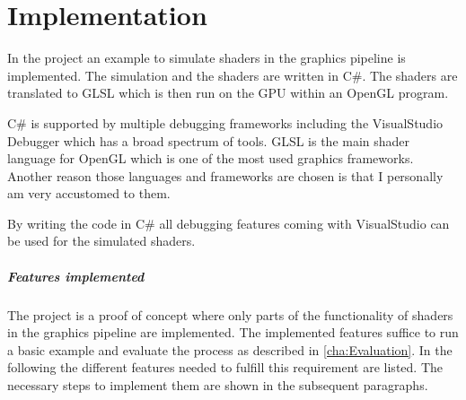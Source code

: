 
\chapter{Implementation}\label{cha:Implementation}

In the project  an example to simulate shaders in the graphics pipeline is implemented. The simulation and the shaders are written in C\#. The shaders are translated to GLSL which is then run on the GPU within an OpenGL program.

C\# is supported by multiple debugging frameworks including the VisualStudio Debugger which has a broad spectrum of tools.  GLSL is the main shader language for OpenGL which is one of the most used graphics frameworks. 
Another reason those languages and frameworks are chosen is that I personally am very accustomed to them.

By writing the code in C\# all debugging features coming with VisualStudio can be used for the simulated shaders.

\paragraph{Features implemented}
\label{paragraph:features}

The project is a proof of concept where only parts of the functionality of shaders in the graphics pipeline are implemented. The implemented features suffice to run a basic example and evaluate the process as described in \autoref{cha:Evaluation}. In the following the different features needed to fulfill this requirement are listed. The necessary steps to implement them are shown in the subsequent paragraphs.

